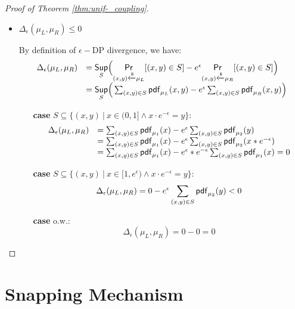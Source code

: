 \documentclass[a4paper,11pt]{article}
\begin{document}
\begin{proof}[Proof of Theorem \ref{thm:unif-_coupling}]
\begin{itemize}
	\item $\Delta_{\epsilon}(\mu_L, \mu_R) \leq 0$

	By definition of $\epsilon-$DP divergence, we have:
	 \[
	 \begin{array}{ll}
	 \Delta_{\epsilon}(\mu_L, \mu_R) 
	 & = \underset{S}{\mathsf{Sup}}
	 \Big(
	 \underset{(x,y) \xleftarrow{\$} \mu_L}{\mathsf{Pr}}[(x,y) \in S] - e^{\epsilon} \underset{(x,y) \xleftarrow{\$} \mu_R}{\mathsf{Pr}}[(x,y) \in S]
	 \Big) \\
	 & =\underset{S}{\mathsf{Sup}}
	 \Big(
	 \sum_{(x,y) \in S} \mathsf{pdf}_{\mu_L}(x, y) - e^{\epsilon} \sum_{(x,y) \in S} \mathsf{pdf}_{\mu_R}(x, y)
	 \Big)	 
	 \end{array}
	 \]
	 \begin{itemize}
	 	\item[{\bf case}]
	 	$S \subseteq \{(x, y) ~|~ 
	 	x \in (0, 1] \land x \cdot e^{-\epsilon} = y \}$:
		\[
		 \begin{array}{ll}
		 \Delta_{\epsilon}(\mu_L, \mu_R) 
		 & = 
		 \sum_{(x,y) \in S} \mathsf{pdf}_{\mu_1}(x) - e^{\epsilon} \sum_{(x,y) \in S} \mathsf{pdf}_{\mu_2}(y)\\
		 & = 
		 \sum_{(x,y) \in S} \mathsf{pdf}_{\mu_1}(x) - e^{\epsilon} \sum_{(x,y) \in S} \mathsf{pdf}_{\mu_2}(x * e^{-\epsilon})\\ 
		 & = 
		 \sum_{(x,y) \in S} \mathsf{pdf}_{\mu_1}(x) - e^{\epsilon}* e^{-\epsilon} \sum_{(x,y) \in S} \mathsf{pdf}_{\mu_1}(x) 
		 = 0 
		 \end{array}
		 \]
	 	\item[{\bf case}] $S \subseteq \{(x, y) 
	 	~|~ x \in [1, e^{\epsilon}) 
	 	\land x \cdot e^{-\epsilon} = y \}$:
		 \[
		 \Delta_{\epsilon}(\mu_L, \mu_R) 
		 = 
		 0 - e^{\epsilon} \sum_{(x,y) \in S} \mathsf{pdf}_{\mu_2}(y) <0
		 \]
	 	\item[{\bf case}] o.w.:
		 \[
		 \Delta_{\epsilon}(\mu_L, \mu_R) = 0 - 0 =  0 
		 \]	 	

	 \end{itemize}

\end{itemize}
\end{proof}
%
%
%
%
\newpage
\section{Snapping Mechanism}
\end{document}
